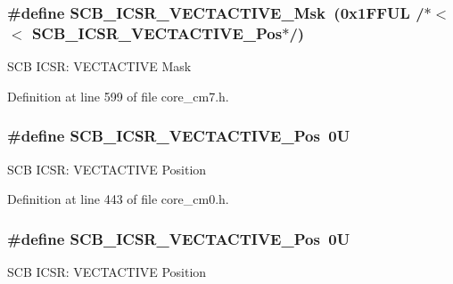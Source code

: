 \subsubsection[{\texorpdfstring{S\+C\+B\+\_\+\+I\+C\+S\+R\+\_\+\+V\+E\+C\+T\+A\+C\+T\+I\+V\+E\+\_\+\+Msk}{SCB_ICSR_VECTACTIVE_Msk}}]{\setlength{\rightskip}{0pt plus 5cm}\#define S\+C\+B\+\_\+\+I\+C\+S\+R\+\_\+\+V\+E\+C\+T\+A\+C\+T\+I\+V\+E\+\_\+\+Msk~(0x1\+F\+F\+U\+L /$\ast$$<$$<$ S\+C\+B\+\_\+\+I\+C\+S\+R\+\_\+\+V\+E\+C\+T\+A\+C\+T\+I\+V\+E\+\_\+\+Pos$\ast$/)}\hypertarget{group___c_m_s_i_s___s_c_b_ga5533791a4ecf1b9301c883047b3e8396}{}\label{group___c_m_s_i_s___s_c_b_ga5533791a4ecf1b9301c883047b3e8396}
S\+CB I\+C\+SR\+: V\+E\+C\+T\+A\+C\+T\+I\+VE Mask 

Definition at line 599 of file core\+\_\+cm7.\+h.

\subsubsection[{\texorpdfstring{S\+C\+B\+\_\+\+I\+C\+S\+R\+\_\+\+V\+E\+C\+T\+A\+C\+T\+I\+V\+E\+\_\+\+Pos}{SCB_ICSR_VECTACTIVE_Pos}}]{\setlength{\rightskip}{0pt plus 5cm}\#define S\+C\+B\+\_\+\+I\+C\+S\+R\+\_\+\+V\+E\+C\+T\+A\+C\+T\+I\+V\+E\+\_\+\+Pos~0U}\hypertarget{group___c_m_s_i_s___s_c_b_gae4f602c7c5c895d5fb687b71b0979fc3}{}\label{group___c_m_s_i_s___s_c_b_gae4f602c7c5c895d5fb687b71b0979fc3}
S\+CB I\+C\+SR\+: V\+E\+C\+T\+A\+C\+T\+I\+VE Position 

Definition at line 443 of file core\+\_\+cm0.\+h.

\subsubsection[{\texorpdfstring{S\+C\+B\+\_\+\+I\+C\+S\+R\+\_\+\+V\+E\+C\+T\+A\+C\+T\+I\+V\+E\+\_\+\+Pos}{SCB_ICSR_VECTACTIVE_Pos}}]{\setlength{\rightskip}{0pt plus 5cm}\#define S\+C\+B\+\_\+\+I\+C\+S\+R\+\_\+\+V\+E\+C\+T\+A\+C\+T\+I\+V\+E\+\_\+\+Pos~0U}\hypertarget{group___c_m_s_i_s___s_c_b_gae4f602c7c5c895d5fb687b71b0979fc3}{}\label{group___c_m_s_i_s___s_c_b_gae4f602c7c5c895d5fb687b71b0979fc3}
S\+CB I\+C\+SR\+: V\+E\+C\+T\+A\+C\+T\+I\+VE Position 

